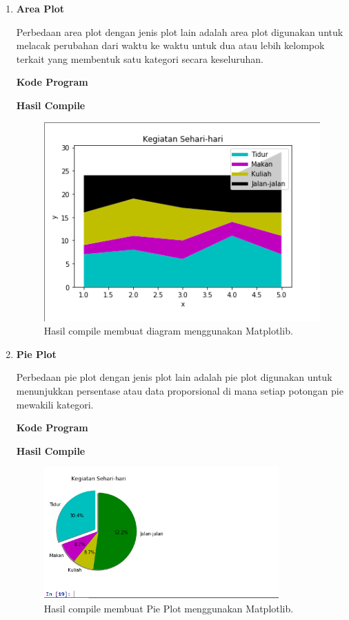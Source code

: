 \begin{enumerate}
	\item \textbf{Area Plot}
	
	Perbedaan area plot dengan jenis plot lain adalah area plot digunakan untuk melacak perubahan dari waktu ke waktu untuk dua atau lebih kelompok terkait yang membentuk satu kategori secara keseluruhan.
	
	\textbf{Kode Program}
	
	
	
	\textbf{Hasil Compile}
	
	\begin{figure}[H]
		\includegraphics[width=12cm]{figures/6/1174089/Teori/area.png}
		\centering
		\caption{Hasil compile membuat diagram menggunakan Matplotlib.}
	\end{figure}
	
	\item \textbf{Pie Plot}
	
	Perbedaan pie plot dengan jenis plot lain adalah pie plot digunakan untuk menunjukkan persentase atau data proporsional di mana setiap potongan pie mewakili kategori.
	
	\textbf{Kode Program}
	
	
	
	\textbf{Hasil Compile}
	
	\begin{figure}[H]
		\includegraphics[width=9cm]{figures/6/1174089/Teori/pie.png}
		\centering
		\caption{Hasil compile membuat Pie Plot menggunakan Matplotlib.}
	\end{figure}
	

\end{enumerate}
